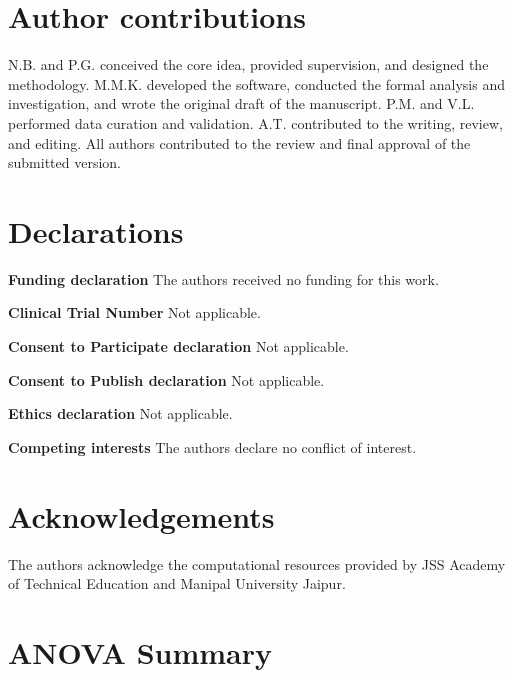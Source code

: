\documentclass[pdflatex,sn-vancouver-num]{sn-jnl}%
\theoremstyle{thmstyleone}%
\theoremstyle{thmstyletwo}%
\theoremstyle{thmstylethree}%
\begin{document}
\section*{Author contributions}
N.B. and P.G. conceived the core idea, provided supervision, and designed the methodology. M.M.K. developed the software, conducted the formal analysis and investigation, and wrote the original draft of the manuscript. P.M. and V.L. performed data curation and validation. A.T. contributed to the writing, review, and editing. All authors contributed to the review and final approval of the submitted version.

\section*{Declarations}
\textbf{Funding declaration} The authors received no funding for this work.

\noindent\textbf{Clinical Trial Number} Not applicable.

\noindent\textbf{Consent to Participate declaration} Not applicable.

\noindent\textbf{Consent to Publish declaration} Not applicable.

\noindent\textbf{Ethics declaration} Not applicable.

\noindent\textbf{Competing interests} The authors declare no conflict of interest.

\section*{Acknowledgements}
The authors acknowledge the computational resources provided by JSS Academy of Technical Education and Manipal University Jaipur.



\appendix

\section{ANOVA Summary}
\label{app:anova}
\end{document}
